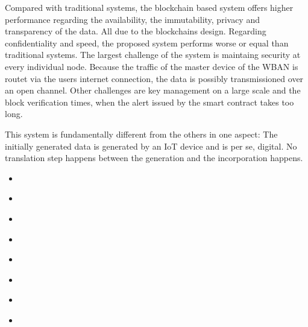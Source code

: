 Compared with traditional systems, the blockchain based system offers higher performance regarding the availability, the immutability, privacy and transparency of the data. All due to the blockchains design. Regarding confidentiality and speed, the proposed system performs worse or equal than traditional systems.
The largest challenge of the system is maintaing security at every individual node. Because the traffic of the master device of the WBAN is routet via the users internet connection, the data is possibly transmissioned over an open channel.  Other challenges are key management on a large scale and the block verification times, when the alert issued by the smart contract takes too long.

This system is fundamentally different from the others in one aspect: The initially generated data is generated by an IoT device and is per se, digital. No translation step happens between the generation and the incorporation happens. 

\begin{itemize}
	\item \cite{Zyskind2015}
	\item \cite{Yue2016}
	\item \cite{Azaria2016}
	\item \cite{Fotiou2016}
	\item \cite{Zhang2017}
	\item \cite{Zhang2018}
	\item \cite{Esposito2018}
	\item \cite{Ekblaw2016}
\end{itemize}

